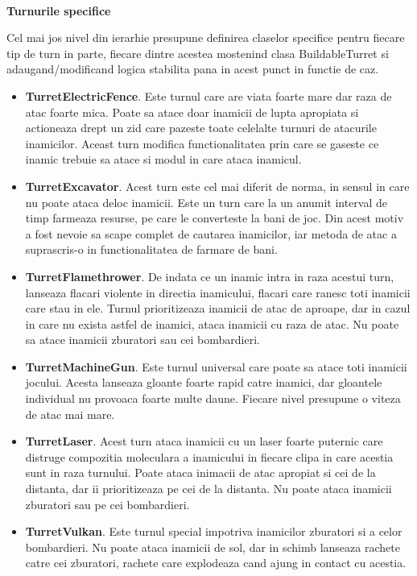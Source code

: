 \documentclass[12pt, a4paper]{article}
\begin{document}
	\ \\
	\textbf{Turnurile specifice}
	
	Cel mai jos nivel din ierarhie presupune definirea claselor specifice pentru fiecare tip de turn in parte, fiecare dintre acestea mostenind clasa BuildableTurret si adaugand/modificand logica stabilita pana in acest punct in functie de caz.
	
	\begin{itemize}
		\item \textbf{TurretElectricFence}. Este turnul care are viata foarte mare dar raza de atac foarte mica. Poate sa atace doar inamicii de lupta apropiata si actioneaza drept un zid care pazeste toate celelalte turnuri de atacurile inamicilor. Aceast turn modifica functionalitatea prin care se gaseste ce inamic trebuie sa atace si modul in care ataca inamicul.
		\item \textbf{TurretExcavator}. Acest turn este cel mai diferit de norma, in sensul in care nu poate ataca deloc inamicii. Este un turn care la un anumit interval de timp farmeaza resurse, pe care le converteste la bani de joc. Din acest motiv a fost nevoie sa scape complet de cautarea inamicilor, iar metoda de atac a suprascris-o in functionalitatea de farmare de bani.
		\item \textbf{TurretFlamethrower}. De indata ce un inamic intra in raza acestui turn, lanseaza flacari violente in directia inamicului, flacari care ranesc toti inamicii care stau in ele. Turnul prioritizeaza inamicii de atac de aproape, dar in cazul in care nu exista astfel de inamici, ataca inamicii cu raza de atac. Nu poate sa atace inamicii zburatori sau cei bombardieri.
		\item \textbf{TurretMachineGun}. Este turnul universal care poate sa atace toti inamicii jocului. Acesta lanseaza gloante foarte rapid catre inamici, dar gloantele individual nu provoaca foarte multe daune. Fiecare nivel presupune o viteza de atac mai mare.
		\item \textbf{TurretLaser}. Acest turn ataca inamicii cu un laser foarte puternic care distruge compozitia moleculara a inamicului in fiecare clipa in care acestia sunt in raza turnului. Poate ataca inimacii de atac apropiat si cei de la distanta, dar ii prioritizeaza pe cei de la distanta. Nu poate ataca inamicii zburatori sau pe cei bombardieri.
		\item \textbf{TurretVulkan}. Este turnul special impotriva inamicilor zburatori si a celor bombardieri. Nu poate ataca inamicii de sol, dar in schimb lanseaza rachete catre cei zburatori, rachete care explodeaza cand ajung in contact cu acestia.
	\end{itemize}
	
\end{document}
